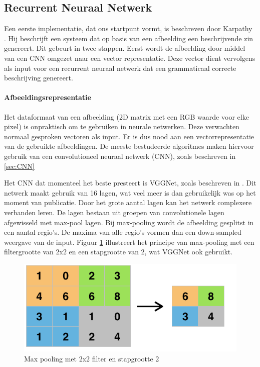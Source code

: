 \subsection{Recurrent Neuraal Netwerk}
Een eerste implementatie, dat ons startpunt vormt, is beschreven door Karpathy \cite{Karpathy2015}. Hij beschrijft een systeem dat op basis van een afbeelding een beschrijvende zin genereert. Dit gebeurt in twee stappen. Eerst wordt de afbeelding door middel van een CNN omgezet naar een vector representatie. Deze vector dient vervolgens als input voor een recurrent neuraal netwerk dat een grammaticaal correcte beschrijving genereert.

\paragraph{Afbeeldingsrepresentatie}

Het dataformaat van een afbeelding (2D matrix met een RGB waarde voor elke pixel) is onpraktisch om te gebruiken in neurale netwerken. Deze verwachten normaal gesproken vectoren als input. Er is dus nood aan een vectorrepresentatie van de gebruikte afbeeldingen. De meeste bestudeerde algoritmes maken hiervoor gebruik van een convolutioneel neuraal netwerk (CNN), zoals beschreven in \ref{sec:CNN}

Het CNN dat momenteel het beste presteert is VGGNet, zoals beschreven in \cite{Arge2015}. Dit netwerk maakt gebruik van 16 lagen, wat veel meer is dan gebruikelijk was op het moment van publicatie. Door het grote aantal lagen kan het netwerk complexere verbanden leren. De lagen bestaan uit groepen van convolutionele lagen afgewisseld met max-pool lagen. Bij max-pooling wordt de afbeelding gesplitst in een aantal regio's. De maxima van alle regio's vormen dan een down-sampled weergave van de input. Figuur \ref{fig:maxpool}  illustreert het principe van max-pooling met een filtergrootte van 2x2 en een stapgrootte van 2, wat VGGNet ook gebruikt.

\begin{figure}[tb]
    \centering
    \includegraphics[width=0.6\linewidth]{Images/maxpool.png}
    \caption{Max pooling met 2x2 filter en stapgrootte 2}
    \label{fig:maxpool}
\end{figure}

